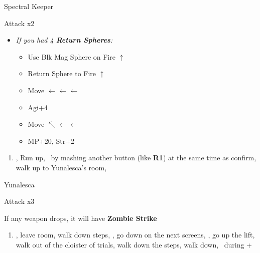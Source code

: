 \begin{battle}[52000]{Spectral Keeper}
    \begin{itemize}
        \summon{\bahamut}
        \bahamutf Attack x2
    \end{itemize}
\end{battle}
\begin{spheregrid}
    \begin{itemize}
        \yunaf
        \item \textit{If you had 4 \textbf{Return Spheres}:}
        \begin{itemize}
            \item Use Blk Mag Sphere on Fire $\uparrow$
            \item Return Sphere to Fire $\uparrow$
            \item Move $\leftarrow\leftarrow\leftarrow$
            \item Agi+4
            \item Move $\nwarrow\leftarrow\leftarrow$
            \item MP+20, Str+2
        \end{itemize}
    \end{itemize}
\end{spheregrid}
\begin{enumerate}[resume]
    \item \save, Run up, \sd\ by mashing another button (like \textbf{R1}) at the same time as confirm, walk up to Yunalesca's room, \sd
\end{enumerate}
\begin{battle}[132000]{Yunalesca}
    \begin{itemize}
        \summon{\bahamut}
        \bahamutf Attack x3
    \end{itemize}
    If any weapon drops, it will have \textbf{Zombie Strike}
\end{battle}
\begin{enumerate}[resume]
    \item \sd, leave room, walk down steps, \sd, go down on the next screens, \save, go up the lift, walk out of the cloister of trials, walk down the steps, walk down, \sd\ during \cs+\skippablefmv
\end{enumerate}
